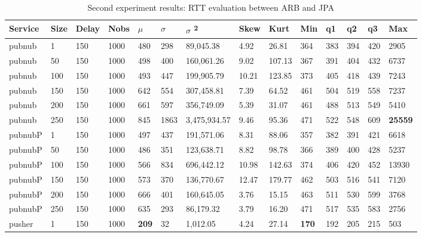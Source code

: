 \begin{table}[!htb]
	\small
	\centering
	\caption{Second experiment results: RTT evaluation between ARB and JPA}
	\label{tab:secondtrialarbjpa}
	\begin{tabular}{llllllllllllll}
		Service    & Size & Delay & Nobs & $\mu$ & $\sigma$  & $\sigma$ \textsuperscript{2} & Skew & Kurt & Min & q1   & q2   & q3   & Max   \\ \midrule
		pubnub     & 1            & 150   & 1000 & 480  & 298  & 89,045.38    & 4.92     & 26.81    & 364 & 383 & 394 & 420 & 2905  \\
		pubnub     & 50           & 150   & 1000 & 498  & 400  & 160,061.26   & 9.02     & 107.13   & 367 & 391 & 404 & 432 & 6737  \\
		pubnub     & 100          & 150   & 1000 & 493  & 447  & 199,905.79   & 10.21    & 123.85   & 373 & 405 & 418 & 439 & 7243  \\
		pubnub     & 150          & 150   & 1000 & 642  & 554  & 307,458.81   & 7.39     & 64.52    & 461 & 504 & 519 & 558 & 7237  \\
		pubnub     & 200          & 150   & 1000 & 661  & 597  & 356,749.09   & 5.39     & 31.07    & 461 & 488 & 513 & 549 & 5410  \\
		pubnub     & 250          & 150   & 1000 & 845  & 1863 & 3,475,934.57 & 9.46     & 95.36    & 471 & 522 & 548 & 609 & \textbf{25559} \\ \hline
		pubnubP & 1            & 150   & 1000 & 497  & 437  & 191,571.06   & 8.31     & 88.06    & 357 & 382 & 391 & 421 & 6618  \\
		pubnubP & 50           & 150   & 1000 & 486  & 351  & 123,638.71   & 8.82     & 98.78    & 366 & 389 & 400 & 428 & 5237  \\
		pubnubP & 100          & 150   & 1000 & 566  & 834  & 696,442.12   & 10.98    & 142.63   & 374 & 406 & 420 & 452 & 13930 \\
		pubnubP & 150          & 150   & 1000 & 573  & 370  & 136,770.67   & 12.47    & 179.77   & 462 & 503 & 516 & 541 & 7120  \\
		pubnubP & 200          & 150   & 1000 & 666  & 401  & 160,645.05   & 3.76     & 15.15    & 463 & 511 & 530 & 599 & 3768  \\
		pubnubP & 250          & 150   & 1000 & 635  & 293  & 86,179.32    & 3.79     & 16.20    & 471 & 517 & 535 & 583 & 2756  \\ \hline
		pusher     & 1            & 150   & 1000 & \textbf{209}  & 32   & 1,012.05     & 4.24     & 27.14    & \textbf{170} & 192 & 205 & 215 & 503   \\

\end{tabular}
\end{table}
